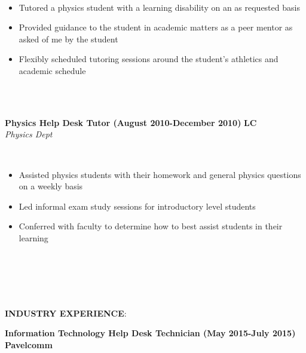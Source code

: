 \documentclass{article}
\begin{document}
\phantom \\
\begin{itemize}
\item Tutored a physics student with a learning disability on an as requested basis
\item Provided guidance to the student in academic matters as a peer mentor as asked of me by the student
\item Flexibly scheduled tutoring sessions around the student’s athletics and academic schedule
\end{itemize}
\phantom \\
\phantom \\
%
%
%
%
\newpage
\begin{vwcol}[widths={0.8,0.2}, sep=.8cm, justify=flush, rule=0pt, indent=0em]
\noindent \textbf{Physics Help Desk Tutor (August 2010-December 2010)}
\newpage
\noindent \textbf{LC}\\
\noindent \emph{Physics Dept}
\end{vwcol}
\phantom \\
\begin{itemize}
\item Assisted physics students with their homework and general physics questions on a weekly basis
\item Led informal exam study sessions for introductory level students
\item Conferred with faculty to determine how to best assist students in their learning
\end{itemize}
\phantom \\
\phantom \\
%
%
%
%
\par
\phantom \\
\phantom \\
\noindent \textbf{INDUSTRY EXPERIENCE}:\\
\begin{vwcol}[widths={0.8,0.2}, sep=.8cm, justify=flush, rule=0pt, indent=0em]
\noindent \textbf{Information Technology Help Desk Technician (May 2015-July 2015)}
\newpage
\noindent \textbf{Pavelcomm}
\end{vwcol}
\end{document}
